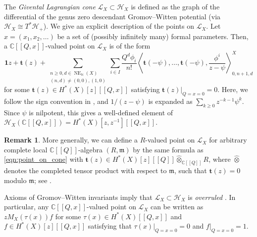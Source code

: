 \documentclass[a4paper,12pt]{amsart}
\numberwithin{equation}{section}
\theoremstyle{definition}
\newtheorem{remark}[theorem]{Remark}
\newcommand{\C}{\mathbb{C}}
\newcommand{\N}{\mathbb{N}}
\newcommand{\bone}{\mathbf{1}}
\newcommand{\bt}{\mathbf{t}}
\newcommand{\cH}{\mathcal{H}}
\newcommand{\cL}{\mathcal{L}}
\newcommand{\NE}{\operatorname{NE}_{\N}}
\def\corr#1{\left\langle#1 \right\rangle}
\begin{document}
The \emph{Givental Lagrangian cone} $\cL_X \subset \cH_X$ \cite{Givental:symplectic} is defined as the graph of the differential of the genus zero descendant Gromov--Witten potential (via $\cH_X\cong T^*\cH_+$).
We give an explicit description of the points on $\cL_X$.
Let $x=(x_1,x_2,\dots)$ be a set of (possibly infinitely many) formal parameters.
Then, a $\C[\![Q,x]\!]$-valued point on $\cL_X$ is of the form
\begin{equation}\label{eqn:point_on_cone}
\bone z + \bt(z) + \sum_{ \substack{n\geq0,d\in\NE(X) \\ (n,d)\neq(0,0),(1,0)} } \sum_{i\in I} \frac{Q^d\phi_i}{n!} \corr{\bt(-\psi),\dots,\bt(-\psi),\frac{\phi^i}{z-\psi}}^X_{0,n+1,d}
\end{equation}
for some $\bt(z)\in H^*(X)[z][\![Q,x]\!]$ satisfying $\bt(z)|_{Q=x=0}=0$.
Here, we follow the sign convention in \cite{IK:quantum,Iritani:blowups}, and $1/(z-\psi)$ is expanded as $\sum_{k\geq0}z^{-k-1}\psi^k$.
Since $\psi$ is nilpotent, this gives a well-defined element of $\cH_X(\C[\![Q,x]\!])=H^*(X)[z,z^{-1}][\![Q,x]\!]$.

\begin{remark}\label{rmk:R-valued_point}
    More generally, we can define a $R$-valued point on $\cL_X$ for arbitrary complete local $\C[\![Q]\!]$-algebra $(R,\mathfrak{m})$ by the same formula as \eqref{eqn:point_on_cone} with $\bt(z)\in H^*(X)[z][\![Q]\!]\widehat{\otimes}_{\C[\![Q]\!]}R$, where $\widehat{\otimes}$ denotes the completed tensor product with respect to $\mathfrak{m}$, such that $\bt(z)=0$ modulo $\mathfrak{m}$; see \cite[Appendix B]{CCIT:computing}.
\end{remark}

Axioms of Gromov--Witten invariants imply that $\cL_X\subset\cH_X$ is \emph{overruled} \cite{Givental:symplectic}.
In particular, any $\C[\![Q,x]\!]$-valued point on $\cL_X$ can be written as $zM_X(\tau(x))f$ for some $\tau(x)\in H^*(X)[\![Q,x]\!]$ and $f\in H^*(X)[z][\![Q,x]\!]$ satisfying that $\tau(x)|_{Q=x=0}=0$ and $f|_{Q=x=0}=1$.
\end{document}
